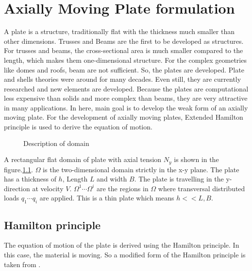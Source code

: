 \documentclass[main.tex]{subfiles}
\begin{document}
\chapter{Axially Moving Plate formulation}

A plate is a structure, traditionally flat with the thickness much smaller than other dimensions. Trusses and Beams are the first to be developed as structures. For trusses and beams, the cross-sectional area is much smaller compared to the length, which makes them one-dimensional structure. For the complex geometries like domes and roofs, beam are not sufficient. So, the plates are developed. Plate and shells theories were around for many decades. Even still, they are currently researched and new elements are developed. Because the plates are computational less expensive than solids and more complex than beams, they are very attractive in many applications.  In here, main goal is to develop the weak form of an axially moving plate. For the development of axially moving plates, Extended Hamilton principle is used to derive the equation of motion.  


\begin{figure}[ht!]
\centering
\caption{Description of domain}
\label{fig:Domain}
\end{figure}

A rectangular flat domain of plate with axial tension $N_y $ is shown in the figure.\ref{fig:Domain}. $\Omega$ is the two-dimensional domain strictly in the x-y plane. The plate has a thickness of $h$, Length $L$ and width $B$. The plate is travelling in the y-direction at velocity $V$. $\Omega^1 \cdots \Omega^i$ are the regions in $\Omega$ where transversal distributed loads $q_1 \cdots q_i$ are applied. This is a thin plate which means $h << L,B $. 

 \section{Hamilton principle}
The equation of motion of the plate is derived using the Hamilton principle. In this case, the material is moving. So a modified form of the Hamilton principle is taken from \cite{HAM_MASS_VAR}.
\end{document}
